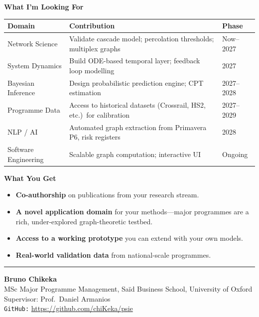 \documentclass[11pt,a4paper]{article}
\begin{document}
\vspace{0.3em}
\noindent\textbf{\textcolor{oxford}{\large What I'm Looking For}}
\vspace{0.3em}

\begin{table}[h!]
\centering
\small
\renewcommand{\arraystretch}{1.25}
\begin{tabularx}{\textwidth}{@{}l X l@{}}
\toprule
\textbf{Domain} & \textbf{Contribution} & \textbf{Phase} \\
\midrule
Network Science & Validate cascade model; percolation thresholds; multiplex graphs & Now--2027 \\
System Dynamics & Build ODE-based temporal layer; feedback loop modelling & 2027 \\
Bayesian Inference & Design probabilistic prediction engine; CPT estimation & 2027--2028 \\
Programme Data & Access to historical datasets (Crossrail, HS2, etc.)\ for calibration & 2027--2029 \\
NLP / AI & Automated graph extraction from Primavera P6, risk registers & 2028 \\
Software Engineering & Scalable graph computation; interactive UI & Ongoing \\
\bottomrule
\end{tabularx}
\end{table}

\vspace{0.3em}
\noindent\textbf{\textcolor{oxford}{\large What You Get}}
\vspace{0.3em}

\begin{itemize}[leftmargin=1.5em, itemsep=2pt]
  \item \textbf{Co-authorship} on publications from your research stream.
  \item \textbf{A novel application domain} for your methods---major programmes are a rich, under-explored graph-theoretic testbed.
  \item \textbf{Access to a working prototype} you can extend with your own models.
  \item \textbf{Real-world validation data} from national-scale programmes.
\end{itemize}

\vspace{0.8em}
\noindent\textcolor{oxford}{\rule{\textwidth}{0.6pt}}
\vspace{0.3em}

\begin{center}
  {\large\bfseries\color{oxford} Bruno Chikeka}\\[0.2em]
  MSc Major Programme Management, Sa\"{i}d Business School, University of Oxford\\
  Supervisor: Prof.\ Daniel Armanios\\[0.3em]
  \texttt{GitHub:} \url{https://github.com/chiKeka/psie}
\end{center}
\end{document}
